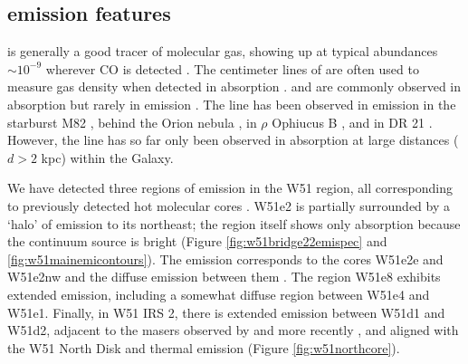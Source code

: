 

\subsection{\formaldehyde emission features}
\label{sec:h2coemission}

\formaldehyde is generally a good tracer of molecular gas, showing up at typical
abundances $\sim10^{-9}$ \hh wherever CO is detected \citep[e.g.,][]{Mangum1993a}.
The centimeter lines of \ortho are often used to measure gas density when
detected in absorption \citep[e.g.,][]{Ginsburg2011a,Zeiger2010a}.
\ortho \oneone and \twotwo are commonly observed in absorption
but rarely in emission \citep[e.g.,][]{Mangum1993a,Araya2007b}.  The \twotwo
line has been observed in emission in the starburst M82 \citep{Mangum2008a},
behind the Orion nebula
\citep{Evans1975a,Kutner1976a,Batrla1983a,Johnston1983a,Bastien1985a,Wilson1989a},
in $\rho$ Ophiucus B
\citep{Loren1980a,Loren1983a,Martin-Pintado1983a,Wadiak1985a}, and in DR 21
\citep{Wilson1982a,Johnston1984a}.  However, the \twotwo line has so far only
been observed in absorption at large distances ($d>2$ kpc) within the Galaxy.

We have detected three regions of \twotwo emission in the W51 region, all
corresponding to previously detected hot molecular cores
\citep{Zhang1997a,Shi2010a,Shi2010b,Goddi2015a,Goddi2016a}.   W51e2 is partially
surrounded by a `halo' of \formaldehyde \twotwo emission to its northeast; the
\hchii region itself shows only \twotwo
absorption because the continuum source is bright
(Figure \ref{fig:w51bridge22emispec} and \ref{fig:w51mainemicontours}).
The \formaldehyde emission corresponds to the cores W51e2e and W51e2nw and the diffuse
emission between them \citep{Goddi2016a,Shi2010a}.
The \hchii region W51e8 exhibits extended \twotwo emission, including a
somewhat diffuse region between W51e4 and W51e1.  Finally, in W51
IRS 2, there is extended \twotwo
emission between W51d1 and W51d2, adjacent to the \ammonia masers
observed by \citet{Zhang1995a} and more recently \citet{Goddi2015a}, and
aligned with the \citet{Zapata2010a} W51 North Disk and thermal \ammonia emission (Figure
\ref{fig:w51northcore}).

